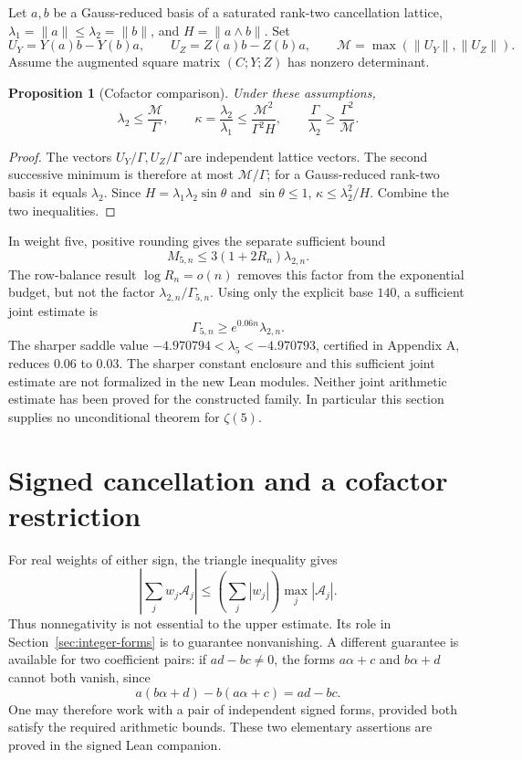 \documentclass[11pt]{article}
\newtheorem{proposition}[theorem]{Proposition}
\theoremstyle{remark}
\newcommand{\cA}{\mathcal A}
\newcommand{\cM}{\mathcal M}
\newcommand{\la}{\lambda}
\begin{document}
Let \(a,b\) be a Gauss-reduced basis of a saturated rank-two cancellation
lattice, \(\la_1=\|a\|\le\la_2=\|b\|\), and
\(H=\|a\wedge b\|\). Set
\[
 U_Y=Y(a)b-Y(b)a,\qquad
 U_Z=Z(a)b-Z(b)a,\qquad
 \cM=\max(\|U_Y\|,\|U_Z\|).
\]
Assume the augmented square matrix \((C;Y;Z)\) has nonzero determinant.

\begin{proposition}[Cofactor comparison]
Under these assumptions,
\[
 \la_2\le\frac{\cM}{\Gamma},\qquad
 \kappa=\frac{\la_2}{\la_1}
       \le\frac{\cM^2}{\Gamma^2 H},\qquad
 \frac{\Gamma}{\la_2}\ge\frac{\Gamma^2}{\cM}.
\]
\end{proposition}
\begin{proof}
The vectors \(U_Y/\Gamma,U_Z/\Gamma\) are independent lattice vectors.
The second successive minimum is therefore at most
\(\cM/\Gamma\); for a Gauss-reduced rank-two basis it equals \(\la_2\).
Since \(H=\la_1\la_2\sin\theta\) and \(\sin\theta\le1\),
\(\kappa\le\la_2^2/H\). Combine the two inequalities.
\end{proof}

In weight five, positive rounding gives the separate sufficient bound
\[
 M_{5,n}\le3(1+2R_n)\la_{2,n}.
\]
The row-balance result \(\log R_n=o(n)\) removes this factor from
the exponential budget, but not the factor \(\la_{2,n}/\Gamma_{5,n}\).
Using only the explicit base \(140\), a sufficient joint estimate is
\[
 \Gamma_{5,n}\ge e^{0.06n}\la_{2,n}.
\]
The sharper saddle value
\(-4.970794<\la_5<-4.970793\), certified in Appendix A,
reduces \(0.06\) to \(0.03\).
The sharper constant enclosure and this sufficient joint estimate are
not formalized in the new Lean modules. Neither joint arithmetic
estimate has been proved for the constructed family.
In particular this section supplies no unconditional theorem for
\(\zeta(5)\).

\section{Signed cancellation and a cofactor restriction}
For real weights of either sign, the triangle inequality gives
\begin{equation}
 \left|\sum_j w_j\cA_j\right|
       \le\left(\sum_j|w_j|\right)\max_j|\cA_j|.
 \label{eq:signed}
\end{equation}
Thus nonnegativity is not essential to the upper estimate. Its role in
Section~\ref{sec:integer-forms} is to guarantee nonvanishing. A different guarantee is available
for two coefficient pairs: if \(ad-bc\ne0\), the forms
\(a\alpha+c\) and \(b\alpha+d\) cannot both vanish, since
\[
 a(b\alpha+d)-b(a\alpha+c)=ad-bc.
\]
One may therefore work with a pair of independent signed forms, provided
both satisfy the required arithmetic bounds. These two elementary
assertions are proved in the signed Lean companion.
\end{document}
